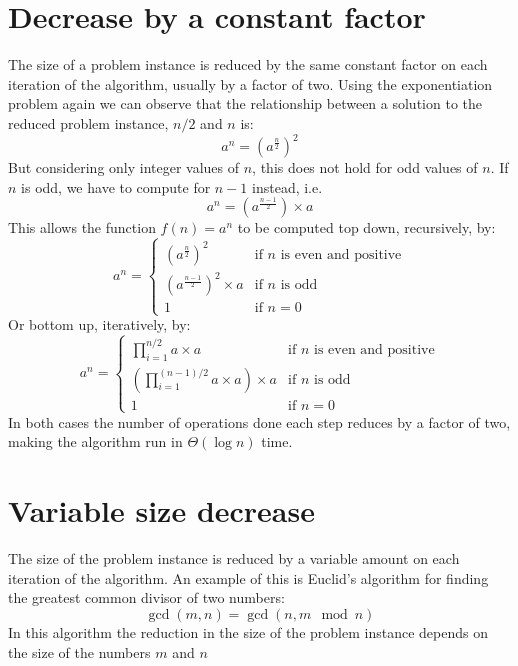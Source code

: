\documentclass[12pt letter]{report}
\begin{document}
\section{Decrease by a constant factor}

The size of a problem instance is reduced  by the same constant factor on each iteration of the algorithm, usually by a
factor of two. Using the exponentiation problem again we can observe that the relationship between a solution to the
reduced problem instance, $n/2$ and $n$ is:
\[
  a^{n} = \left( a ^{\frac{n}{2}} \right)^{2}
\]
But considering only integer values of $n$, this does not hold for odd values of $n$. If $n$ is odd, we have to compute
for $n-1$ instead, i.e.
\[
  a^{n} = \left( a^{\frac{n-1}{2}} \right)\times a
\]
This allows the function $f \left( n \right) = a^{n} $ to be computed top down, recursively, by:
\[
  a^{n} = \begin{cases}
    \left( a^{\frac{n}{2}} \right) ^2           & \text{if $n$ is even and positive} \\
    \left( a^{\frac{n-1}{2}} \right)^2 \times a & \text{if $n$ is odd}               \\
    1                                           & \text{if $n = 0$}
  \end{cases}
\]
Or bottom up, iteratively, by:
\[
  a^{n} = \begin{cases}
    \prod_{i = 1}^{n/2} a \times a                             & \text{if $n$ is even and positive} \\
    \left( \prod_{i = 1}^{(n-1)/2} a \times a \right) \times a & \text{if $n$ is odd}               \\
    1                                                          & \text{if $n = 0$}
  \end{cases}
\]
In both cases the number of operations done each step reduces by a factor of two, making the algorithm run in $\Theta
  \left( \log n \right) $ time.

\section{Variable size decrease}

The size of the problem instance is reduced by a variable amount on each iteration of the algorithm. An example of this
is Euclid's algorithm for finding the greatest common divisor of two numbers:
\[
  \gcd \left( m, n \right)  = \gcd \left( n, m\mod n \right)
\]
In this algorithm the reduction in the size of the problem instance depends on the size of the numbers $m$ and $n$
\end{document}
